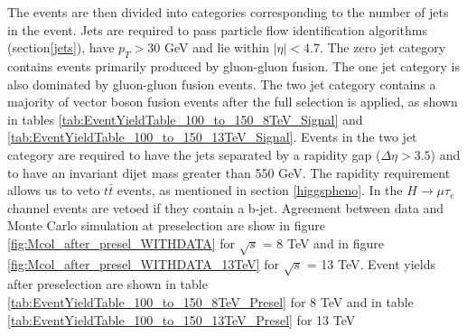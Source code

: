 \documentclass[oneside, letterpaper, oldfontcommands]{memoir}
\begin{document}
\qquad The events are then divided into categories corresponding to the number of jets in the event. Jets are required to pass particle flow identification algorithms (section\ref{jets}), have $p_{T} > 30$ GeV and lie within $|\eta| < 4.7$. The zero jet category contains events primarily produced by gluon-gluon fusion. The one jet category is also dominated by gluon-gluon fusion events. The two jet category contains a majority of vector boson fusion events after the full selection is applied, as shown in tables \ref{tab:EventYieldTable_100_to_150_8TeV_Signal} and \ref{tab:EventYieldTable_100_to_150_13TeV_Signal}. Events in the two jet category are required to have the jets separated by a rapidity gap ($\Delta\eta > 3.5$) and to have an invariant dijet mass greater than 550 GeV. The rapidity requirement allows us to veto $t\bar{t}$ events, as mentioned in section \ref{higgspheno}. In the $H \rightarrow \mu\tau_{e}$ channel events are vetoed if they contain a b-jet. Agreement between data and Monte Carlo simulation at preselection are show in figure \ref{fig:Mcol_after_presel_WITHDATA} for $\sqrt{s}$ = 8 TeV and in figure \ref{fig:Mcol_after_presel_WITHDATA_13TeV} for $\sqrt{s}$ = 13 TeV.
Event yields after preselection are shown in table \ref{tab:EventYieldTable_100_to_150_8TeV_Presel} for 8 TeV and in table \ref{tab:EventYieldTable_100_to_150_13TeV_Presel} for 13 TeV
\end{document}
